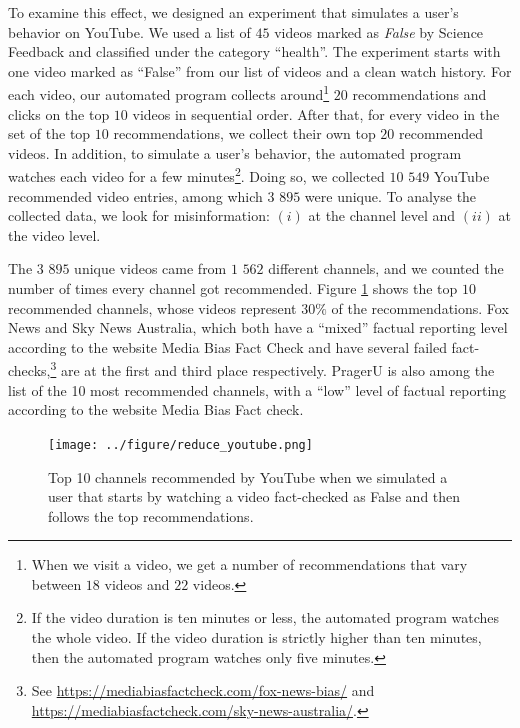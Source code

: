 \documentclass{article}
\begin{document}
To examine this effect, we designed an experiment that simulates a user's behavior on YouTube. 
We used a list of $45$ videos marked as {\it False} by Science Feedback and classified under the category ``health''.
The experiment starts with one video marked as ``False'' from our list of videos and a clean watch history.
For each video, our automated program collects around\footnote{When we visit a video, we get a number of recommendations that vary between $18$ videos and $22$ videos.}
$20$ recommendations and clicks on the top $10$ videos in sequential order. 
After that, for every video in the set of the top $10$ recommendations, we collect their own top $20$ recommended videos.
In addition, to simulate a user's behavior, the automated program watches each video for a few minutes\footnote{If the video duration is ten minutes or less, the automated program watches the whole video. If the video duration is strictly higher than ten minutes, then the automated program watches only five minutes.}.
Doing so, we collected $10$ $549$ YouTube recommended video entries, among which $3$ $895$ were unique. 
To analyse the collected data, we look for misinformation: $(i)$ at the channel level and $(ii)$ at the video level. 

\smallskip

The $3$ $895$ unique videos came from $1$ $562$ different channels, and we counted the number of times every channel got recommended.
Figure \ref{reduce_youtube} shows the top $10$ recommended channels, whose videos represent $30\%$ of the recommendations.
Fox News and Sky News Australia, which both have a ``mixed'' factual reporting level according to the website Media Bias Fact Check and have several failed fact-checks,\footnote{See \href{https://mediabiasfactcheck.com/fox-news-bias/}{https://mediabiasfactcheck.com/fox-news-bias/} and \href{https://mediabiasfactcheck.com/sky-news-australia/}{https://mediabiasfactcheck.com/sky-news-australia/}.} are at the first and third place respectively.
PragerU is also among the list of the 10 most recommended channels, with a ``low'' level of factual reporting according to the website Media Bias Fact check. 
\smallskip 

\begin{figure}[h]
	\begin{center}
		\texttt{[image: ../figure/reduce\_youtube.png]} 
	\end{center}
	\caption{Top 10 channels recommended by YouTube when we simulated a user that starts by watching a video fact-checked as False and then follows the top recommendations.}
	\label{reduce_youtube}
\end{figure}
\end{document}
